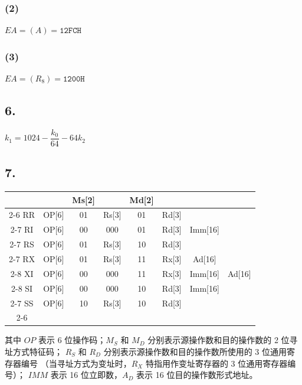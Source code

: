 \documentclass[12pt, a4paper]{ctexart}
\begin{document}
\subsubsection*{(2)}

$EA=(A)=\mathtt{12FCH}$

\subsubsection*{(3)}

$EA=(R_8)=\mathtt{1200H}$

\subsection*{6.}

$k_1=1024-\dfrac{k_0}{64}-64k_2$

\subsection*{7.}

\begin{table}[H]
    \centering
    \begin{tabular}{c|c|c|c|c|c|c|c|}
        \multicolumn{2}{c}{} & \multicolumn{1}{c}{Ms[2]} &
        \multicolumn{1}{c}{} & \multicolumn{1}{c}{Md[2]} \\
        \cline{2-6}
        RR & OP[6] & 01 & Rs[3] & 01 & Rd[3] \\ \cline{2-7}
        RI & OP[6] & 00 & 000   & 01 & Rd[3] & Imm[16] \\ \cline{2-7}
        RS & OP[6] & 01 & Rs[3] & 10 & Rd[3] \\ \cline{2-7}
        RX & OP[6] & 01 & Rs[3] & 11 & Rx[3] & Ad[16]  \\ \cline{2-8}
        XI & OP[6] & 00 & 000   & 11 & Rx[3] & Imm[16] & Ad[16] \\ \cline{2-8}
        SI & OP[6] & 00 & 000   & 10 & Rd[3] & Imm[16] \\ \cline{2-7}
        SS & OP[6] & 10 & Rs[3] & 10 & Rd[3] \\ \cline{2-6}
    \end{tabular}
\end{table}

其中 $OP$ 表示 6 位操作码；$M_S$ 和 $M_D$ 分别表示源操作数和目的操作数的 2 位寻址方式特征码；
$R_S$ 和 $R_D$ 分别表示源操作数和目的操作数所使用的 3 位通用寄存器编号
（当寻址方式为变址时，$R_X$ 特指用作变址寄存器的 3 位通用寄存器编号）；
$IMM$ 表示 16 位立即数，$A_D$ 表示 16 位目的操作数形式地址。
\end{document}
